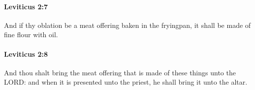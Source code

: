 		\paragraph{Leviticus 2:7} %
			\label{LEVITICUS-2-7}

			And if thy oblation be a meat offering baken in the fryingpan, it shall be made of fine flour with oil.


		\paragraph{Leviticus 2:8} %
			\label{LEVITICUS-2-8}

			And thou shalt bring the meat offering that is made of these things unto the LORD: and when it is presented unto the priest, he shall bring it unto the altar.


